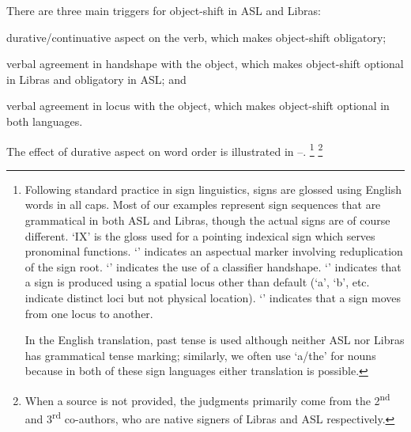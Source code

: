 \documentclass[output=paper,colorlinks,citecolor=brown,
]{langscibook}
\begin{document}
There are three main triggers for object-shift in ASL and
Libras: 
\begin{inparaenum}[1.]
    \item durative/continuative aspect on the verb, which makes object-shift obligatory; 
    \item verbal agreement in handshape with the object, which makes object-shift 
    optional in Libras and obligatory in ASL; and 
    \item verbal agreement in locus with the object, which makes object-shift optional in both languages. 
\end{inparaenum}
The effect of durative aspect on word order is illustrated in --.%
\footnote{
    Following standard practice in sign linguistics, signs are glossed using
    English words in all caps. Most of our examples represent sign sequences that are
    grammatical in both ASL and Libras, though the actual signs are of course different.
    `IX' is the gloss used for a pointing indexical sign which serves
    pronominal functions. `\laszAsp{}' indicates an aspectual marker involving reduplication
    of the sign root. `\laszHs{\_}' indicates the use of a classifier handshape. `\laszLoc{\_}'
    indicates that a sign is produced using a spatial locus other than default (`a', `b',
    etc. indicate distinct loci but not physical location). `\laszDir{\_}{\_}' indicates that a sign
    moves from one locus to another. \par 
    In the English translation, past tense is used although neither ASL nor
    Libras has grammatical tense marking; similarly, we often use `a/the' for nouns
    because in both of these sign languages either translation is possible.
}%
\footnote{
    When a source is not provided, the judgments primarily come from the
    2\textsuperscript{nd} and 3\textsuperscript{rd} co-authors, who are native signers of Libras and ASL respectively.
}
\ea
    \label{lasz:ex:1}
    \z 
\ex
    \label{lasz:ex:2}
\end{document}
